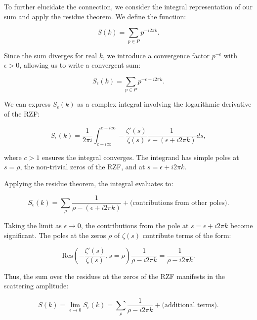 \documentclass[11pt, oneside]{article}
\begin{document}
To further elucidate the connection, we consider the integral representation of our sum and apply the residue theorem. We define the function:

\begin{equation} S(k) = \sum_{p \in P} p^{-i 2\pi k}. \end{equation}

Since the sum diverges for real $k$, we introduce a convergence factor $p^{-\epsilon}$ with $\epsilon > 0$, allowing us to write a convergent sum:

\begin{equation} S_\epsilon(k) = \sum_{p \in P} p^{- \epsilon - i 2\pi k}. \end{equation}

We can express $S_\epsilon(k)$ as a complex integral involving the logarithmic derivative of the RZF:

\begin{equation} S_\epsilon(k) = \frac{1}{2\pi i} \int_{c - i \infty}^{c + i \infty} -\frac{\zeta'(s)}{\zeta(s)} \frac{1}{s - (\epsilon + i 2\pi k)} ds, \end{equation}

where $c > 1$ ensures the integral converges. The integrand has simple poles at $s = \rho$, the non-trivial zeros of the RZF, and at $s = \epsilon + i 2\pi k$.

Applying the residue theorem, the integral evaluates to:

\begin{equation} S_\epsilon(k) = \sum_{\rho} \frac{1}{\rho - (\epsilon + i 2\pi k)} + \text{(contributions from other poles)}. \end{equation}

Taking the limit as $\epsilon \to 0$, the contributions from the pole at $s = \epsilon + i 2\pi k$ become significant. The poles at the zeros $\rho$ of $\zeta(s)$ contribute terms of the form:

\begin{equation} \text{Res}\left(-\frac{\zeta'(s)}{\zeta(s)}, s = \rho\right) \frac{1}{\rho - i 2\pi k} = \frac{1}{\rho - i 2\pi k}. \end{equation}

Thus, the sum over the residues at the zeros of the RZF manifests in the scattering amplitude:

\begin{equation} S(k) = \lim_{\epsilon \to 0} S_\epsilon(k) = \sum_{\rho} \frac{1}{\rho - i 2\pi k} + \text{(additional terms)}. \end{equation}
\end{document}
